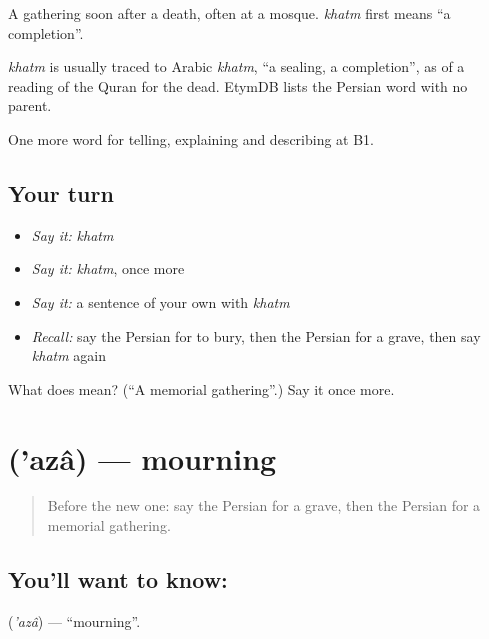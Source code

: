A gathering soon after a death, often at a mosque. \emph{khatm} first means \textquotedblleft{}a completion\textquotedblright{}.

\begin{cousinweb}
\emph{khatm} is usually traced to Arabic \emph{khatm}, \textquotedblleft{}a sealing, a completion\textquotedblright{}, as of a reading of the Quran for the dead. EtymDB lists the Persian word with no parent.
\end{cousinweb}

\begin{grammarlens}[title={What you've built}]
One more word for telling, explaining and describing at B1.
\end{grammarlens}

\subsection*{Your turn}
\begin{itemize}
\raggedright
  \item \emph{Say it:} \emph{khatm}
  \item \emph{Say it:} \emph{khatm}, once more
  \item \emph{Say it:} a sentence of your own with \emph{khatm}
  \item \emph{Recall:} say the Persian for to bury, then the Persian for a grave, then say \emph{khatm} again
\end{itemize}

\begin{tcolorbox}[breakable,colback=teal!4,colframe=teal!35!black,title={Before you move on}]
What does  mean? (\textquotedblleft{}A memorial gathering\textquotedblright{}.) Say it once more.
\end{tcolorbox}
\section[\texorpdfstring{\fa{عزا} ('azâ)}{عزا ('azâ)}]{ ('azâ) — mourning}

\label{lesson:FA-C338-aza}



\begin{quote}
Before the new one: say the Persian for a grave, then the Persian for a memorial gathering.
\end{quote}

\subsection*{You'll want to know: }
\textbf{} (\emph{'azâ}) — \textquotedblleft{}mourning\textquotedblright{}.

